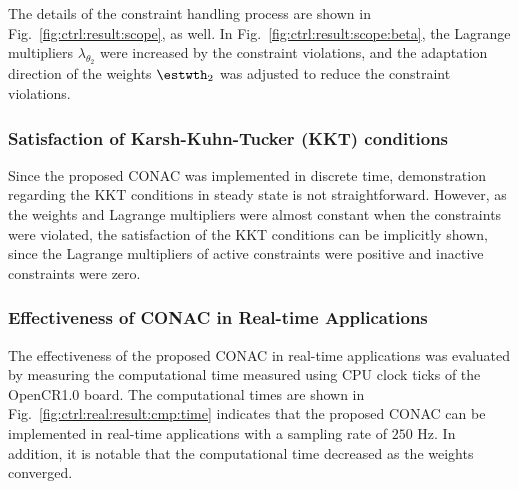 \documentclass[lettersize,journal]{IEEEtran}
\begin{document}
The details of the constraint handling process are shown in Fig.~\ref{fig:ctrl:result:scope}, as well.
In Fig.~\ref{fig:ctrl:result:scope:beta}, the Lagrange multipliers $\lambda_{\theta_2}$ were increased by the constraint violations, and the adaptation direction of the weights $\estwth_2$ was adjusted to reduce the constraint violations.

\hfill
\subsubsection{Satisfaction of Karsh-Kuhn-Tucker (KKT) conditions}

Since the proposed CONAC was implemented in discrete time, demonstration regarding the KKT conditions in steady state is not straightforward.
However, as the weights and Lagrange multipliers were almost constant when the constraints were violated, the satisfaction of the KKT conditions can be implicitly shown, since the Lagrange multipliers of active constraints were positive and inactive constraints were zero.


\hfill
\subsubsection{Effectiveness of CONAC in Real-time Applications}

The effectiveness of the proposed CONAC in real-time applications was evaluated by measuring the computational time measured using CPU clock ticks of the OpenCR1.0 board.
The computational times are shown in Fig.~\ref{fig:ctrl:real:result:cmp:time} indicates that the proposed CONAC can be implemented in real-time applications with a sampling rate of $250$ Hz.
In addition, it is notable that the computational time decreased as the weights converged.
\end{document}
